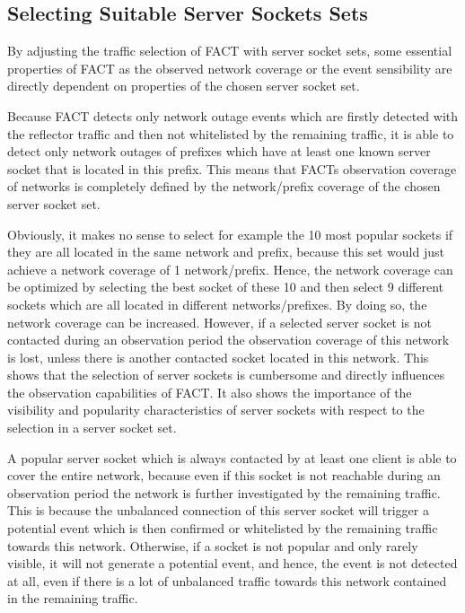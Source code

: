 \subsection{Selecting Suitable Server Sockets Sets\label{section:ses_selection}}
By adjusting the traffic selection of \gls{FACT} with \gls{server socket} sets,  some essential properties of \gls{FACT} as the observed network coverage or the event sensibility are directly dependent on properties of the chosen \gls{server socket} set. 

Because \gls{FACT} detects only network outage events which are firstly detected  with the reflector traffic and then not whitelisted by the remaining traffic, it  is able to detect only network outages of prefixes which have at least one known  server socket that is located in this prefix. This means that FACTs observation  coverage of networks is completely defined by the network/prefix coverage of the  chosen \gls{server socket} set. 

Obviously, it makes no sense to select for example the 10 most popular sockets if they are all located in the same network and prefix, because this set would just achieve a network coverage of 1 network/prefix. 
Hence, the network coverage can be optimized by selecting the best socket of these 10 and then select 9 different sockets which are all located in different networks/prefixes. 
By doing so, the network coverage can be increased. However, if a selected  \gls{server socket} is not contacted during an observation period the observation coverage of this network is lost, unless there is another contacted socket located in this network. 
This shows that the selection of \glspl{server socket} is cumbersome and directly influences the observation capabilities of FACT. It also shows the importance of the visibility and popularity characteristics of \glspl{server socket} with respect to the selection in a \gls{server socket} set. 

A popular \gls{server socket} which is always contacted by at least one client is able to cover the entire network, because even if this socket is not reachable during an observation period the network is further investigated by the remaining traffic. 
This is because the unbalanced connection of this \gls{server socket} will trigger a potential event which is then confirmed or whitelisted by the  remaining traffic towards this network. 
Otherwise, if a socket is not popular and only rarely visible, it will not generate a potential event, and hence, the event is not detected at all, even if there is a lot of unbalanced traffic towards this network contained in the remaining traffic. 

